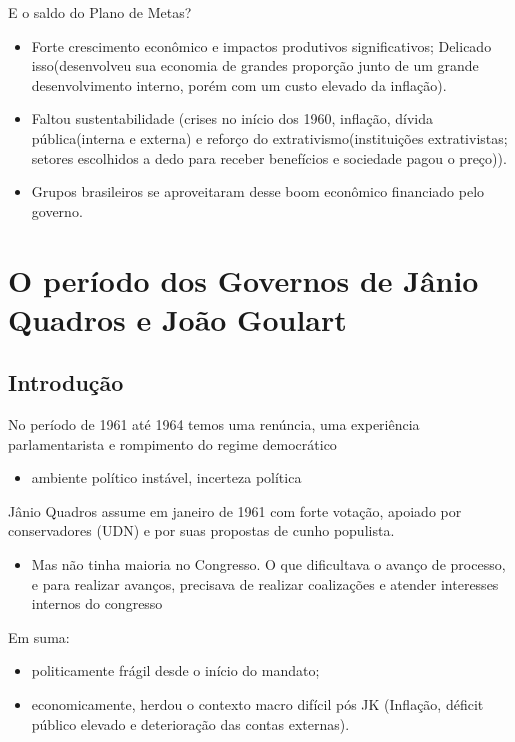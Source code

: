 \documentclass[a4paper,12pt]{article}[abntex2]
\begin{document}
E o saldo do Plano de Metas?\begin{itemize}
    \item Forte crescimento econômico e impactos produtivos significativos; Delicado isso(desenvolveu sua economia de grandes proporção junto de um grande desenvolvimento interno, porém com um custo elevado da inflação).
    \item Faltou sustentabilidade (crises no início dos 1960, inflação, dívida pública(interna e externa) e reforço do extrativismo(instituições extrativistas; setores escolhidos a dedo para receber benefícios e sociedade pagou o preço)).
    \item Grupos brasileiros se aproveitaram desse boom econômico financiado pelo governo.
\end{itemize}

\section{\textbf{O período dos Governos de Jânio Quadros e João Goulart}}

\subsection{\textbf{Introdução}}
No período de 1961 até 1964 temos uma renúncia, uma experiência parlamentarista e rompimento do regime democrático\begin{itemize}
    \item ambiente político instável, incerteza política
\end{itemize}

Jânio Quadros assume em janeiro de 1961 com forte votação, apoiado por conservadores (UDN) e por suas propostas de cunho populista.\begin{itemize}
    \item Mas não tinha maioria no Congresso. O que dificultava o avanço de processo, e para realizar avanços, precisava de realizar coalizações e atender interesses internos do congresso
\end{itemize}

Em suma:\begin{itemize}
    \item politicamente frágil desde o início do mandato;
    \item economicamente, herdou o contexto macro difícil pós JK (Inflação, déficit público elevado e deterioração das contas externas).
\end{itemize}
\end{document}
